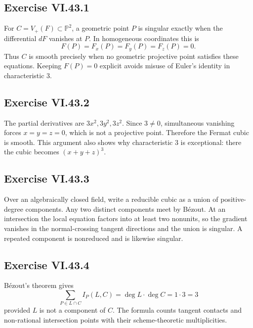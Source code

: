 \subsection*{Exercise VI.43.1}
\begin{solution}
For \(C=V_+(F)\subset\mathbb P^2\), a geometric point \(P\) is singular exactly when the differential \(dF\) vanishes at \(P\).  In homogeneous coordinates this is
\[
F(P)=F_x(P)=F_y(P)=F_z(P)=0.
\]
Thus \(C\) is smooth precisely when no geometric projective point satisfies these equations.  Keeping \(F(P)=0\) explicit avoids misuse of Euler's identity in characteristic \(3\).
\end{solution}

\subsection*{Exercise VI.43.2}
\begin{solution}
The partial derivatives are \(3x^2,3y^2,3z^2\).  Since \(3\neq0\), simultaneous vanishing forces \(x=y=z=0\), which is not a projective point.  Therefore the Fermat cubic is smooth.  This argument also shows why characteristic \(3\) is exceptional: there the cubic becomes \((x+y+z)^3\).
\end{solution}

\subsection*{Exercise VI.43.3}
\begin{solution}
Over an algebraically closed field, write a reducible cubic as a union of positive-degree components.  Any two distinct components meet by Bézout.  At an intersection the local equation factors into at least two nonunits, so the gradient vanishes in the normal-crossing tangent directions and the union is singular.  A repeated component is nonreduced and is likewise singular.
\end{solution}

\subsection*{Exercise VI.43.4}
\begin{solution}
Bézout's theorem gives
\[
\sum_{P\in L\cap C} I_P(L,C)=\deg L\cdot\deg C=1\cdot3=3
\]
provided \(L\) is not a component of \(C\).  The formula counts tangent contacts and non-rational intersection points with their scheme-theoretic multiplicities.
\end{solution}

